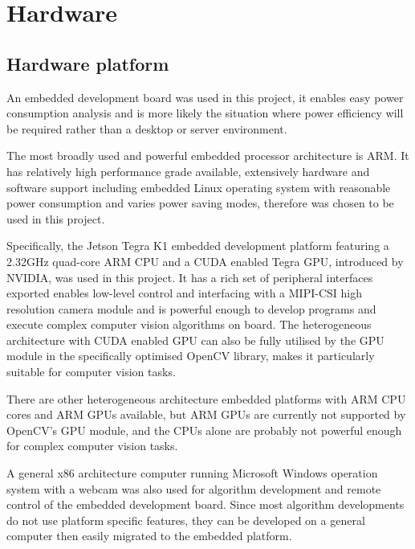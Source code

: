 
\section{Hardware}


\subsection{Hardware platform}


An embedded development board was used in this project, it enables easy power consumption analysis and is more likely the situation where power efficiency will be required rather than a desktop or server environment.

The most broadly used and powerful embedded processor architecture is ARM. It has relatively high performance grade available, extensively hardware and software support including embedded Linux operating system with reasonable power consumption and varies power saving modes, therefore was chosen to be used in this project.

Specifically, the Jetson Tegra K1 embedded development platform \cite{NVIDIA:tk1} featuring a 2.32GHz quad-core ARM CPU and a CUDA enabled Tegra GPU, introduced by NVIDIA, was used in this project. It has a rich set of peripheral interfaces exported enables low-level control and interfacing with a MIPI-CSI high resolution camera module and is powerful enough to develop programs and execute complex computer vision algorithms on board. The heterogeneous architecture with CUDA enabled GPU can also be fully utilised by the GPU module in the specifically optimised OpenCV library, makes it particularly suitable for computer vision tasks.

There are other heterogeneous architecture embedded platforms with ARM CPU cores and ARM GPUs available, but ARM GPUs are currently not supported by OpenCV's GPU module, and the CPUs alone are probably not powerful enough for complex computer vision tasks.


A general x86 architecture computer running Microsoft Windows operation system with a webcam was also used for algorithm development and remote control of the embedded development board. Since most algorithm developments do not use platform specific features, they can be developed on a general computer then easily migrated to the embedded platform.

